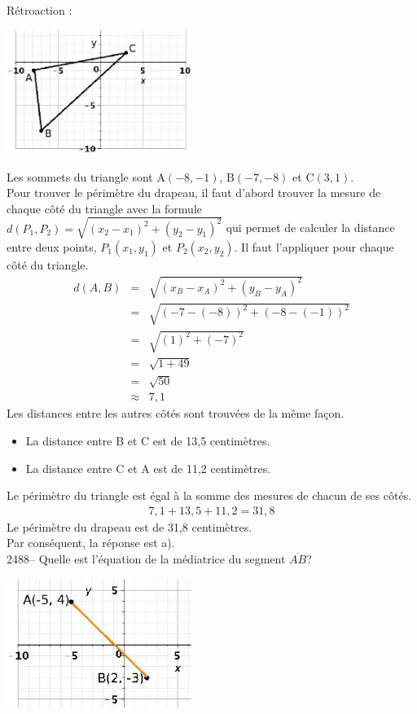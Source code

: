 \documentclass[letterpaper, 12pt]{article}
\begin{document}
R\'etroaction :\\
\begin{center}
 \includegraphics[width=6cm,bb=14 14 406 276]{Q2486.eps}
\end{center}
Les sommets du triangle sont A$(-8, -1)$, B$(-7, -8)$ et C$(3, 1)$.\\
Pour trouver le p\'erim\`etre du drapeau, il faut d'abord trouver la mesure de chaque c\^ot\'e du triangle avec la formule $d(P_{1}, P_{2})=\sqrt{(x_{2}-x_{1})^{2}+(y_{2}-y_{1})^{2}}$ qui permet de calculer la distance entre deux points, $P_{1}(x_{1}, y_{1})$ et $P_{2}(x_{2}, y_{2})$. Il faut l'appliquer pour chaque c\^ot\'e du triangle.
\begin{eqnarray*}
 d(A, B)&=&\sqrt{(x_{B}-x_{A})^{2}+(y_{B}-y_{A})^{2}}\\
&=&\sqrt{(-7-(-8))^{2}+(-8-(-1))^{2}}\\
&=&\sqrt{(1)^{2}+(-7)^{2}}\\
&=&\sqrt{1+49}\\
&=&\sqrt{50}\\
&\approx&7,1
\end{eqnarray*}
Les distances entre les autres c\^ot\'es sont trouv\'ees de la m\^eme fa\c con.
\begin{itemize}
 \item La distance entre B et C est de 13,5 centim\`etres.
\item La distance entre C et A est de 11,2 centim\`etres.\\
\end{itemize}
Le p\'erim\`etre du triangle est \'egal \`a la somme des mesures de chacun de ses c\^ot\'es.
\begin{eqnarray*}
 7,1+13,5+11,2=31,8
\end{eqnarray*}
Le p\'erim\`etre du drapeau est de 31,8 centim\`etres.\\
Par cons\'equent, la r\'eponse est a).\\

2488-- Quelle est l'\'equation de la m\'ediatrice du segment $\overline{AB}$?\\
\begin{center}
 \includegraphics[width=6cm,bb=14 14 329 231]{Q2488.eps}
\end{center}
\end{document}
